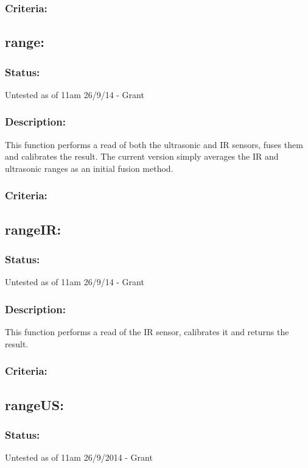 \documentclass[]{article}
\begin{document}
\subsubsection{Criteria:}

\subsection{range:}
\subsubsection{Status:}
Untested as of 11am 26/9/14 - Grant

\subsubsection{Description:}
This function performs a read of both the ultrasonic and IR sensors, fuses them and calibrates the result. The current version simply averages the IR and ultrasonic ranges as an initial fusion method.

\subsubsection{Criteria:}

\subsection{rangeIR:}
\subsubsection{Status:}
Untested as of 11am 26/9/14 - Grant

\subsubsection{Description:}
This function performs a read of the IR sensor, calibrates it and returns the result.

\subsubsection{Criteria:}

\subsection{rangeUS:}
\subsubsection{Status:}
Untested as of 11am 26/9/2014 - Grant
\end{document}

